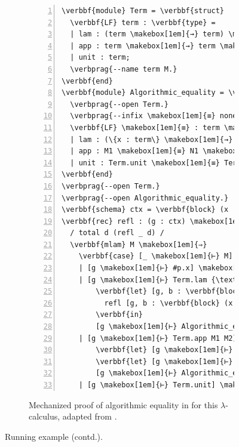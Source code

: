 \begin{figure}\ContinuedFloat
\begin{subfigure}{\linewidth}
\begin{Verbatim}[commandchars=\\\{\}, baselinestretch=1, numbers=left]
\verbbf{module} Term = \verbbf{struct}
  \verbbf{LF} term : \verbbf{type} =
  | lam : (term \makebox[1em]{→} term) \makebox[1em]{→} term
  | app : term \makebox[1em]{→} term \makebox[1em]{→} term
  | unit : term;
  \verbprag{--name term M.}
\verbbf{end}
\verbbf{module} Algorithmic_equality = \verbbf{struct}
  \verbprag{--open Term.}
  \verbprag{--infix \makebox[1em]{≡} none.}
  \verbbf{LF} \makebox[1em]{≡} : term \makebox[1em]{→} term \makebox[1em]{→} \verbbf{type} =
  | lam : (\{x : term\} \makebox[1em]{→} x \makebox[1em]{≡} x \makebox[1em]{→} M x \makebox[1em]{≡} N x) \makebox[1em]{→} Term.lam M \makebox[1em]{≡} Term.lam N
  | app : M1 \makebox[1em]{≡} N1 \makebox[1em]{→} M2 \makebox[1em]{≡} N2 \makebox[1em]{→} Term.app M1 M2 \makebox[1em]{≡} Term.app N1 N2
  | unit : Term.unit \makebox[1em]{≡} Term.unit;
\verbbf{end}
\verbprag{--open Term.}
\verbprag{--open Algorithmic_equality.}
\verbbf{schema} ctx = \verbbf{block} (x : term, eq : x \makebox[1em]{≡} x);
\verbbf{rec} refl : (g : ctx) \makebox[1em]{→} \{M : [g \makebox[1em]{⊢} term]\} \makebox[1em]{→} [g \makebox[1em]{⊢} M \makebox[1em]{≡} M] =
  / total d (refl _ d) /
  \verbbf{mlam} M \makebox[1em]{⇒}
    \verbbf{case} [_ \makebox[1em]{⊢} M] \verbbf{of}
    | [g \makebox[1em]{⊢} #p.x] \makebox[1em]{⇒} [g \makebox[1em]{⊢} #p.eq]
    | [g \makebox[1em]{⊢} Term.lam {\textbackslash}x. F] \makebox[1em]{⇒}
        \verbbf{let} [g, b : \verbbf{block} (x : term, eq : x \makebox[1em]{≡} x) \makebox[1em]{⊢} D] =
          refl [g, b : \verbbf{block} (x : term, eq : x \makebox[1em]{≡} x) \makebox[1em]{⊢} F[\monoellipsis, b.x]]
        \verbbf{in}
        [g \makebox[1em]{⊢} Algorithmic_equality.lam {\textbackslash}x. {\textbackslash}eq. D[\monoellipsis, <x; eq>]]
    | [g \makebox[1em]{⊢} Term.app M1 M2] \makebox[1em]{⇒}
        \verbbf{let} [g \makebox[1em]{⊢} D1] = refl [g \makebox[1em]{⊢} M1] \verbbf{in}
        \verbbf{let} [g \makebox[1em]{⊢} D2] = refl [g \makebox[1em]{⊢} M2] \verbbf{in}
        [g \makebox[1em]{⊢} Algorithmic_equality.app D1 D2]
    | [g \makebox[1em]{⊢} Term.unit] \makebox[1em]{⇒} [g \makebox[1em]{⊢} Algorithmic_equality.unit];
\end{Verbatim}
\caption[Algorithmic equality in \Beluga]{%
Mechanized proof of algorithmic equality in \Beluga for this $\lambda$-calculus, adapted from \cite{felty2010reasoning}.
}
\label{figure:running-example-implementation}
\end{subfigure}
\caption[]{Running example (contd.).}
\label{figure:running-example}
\end{figure}

